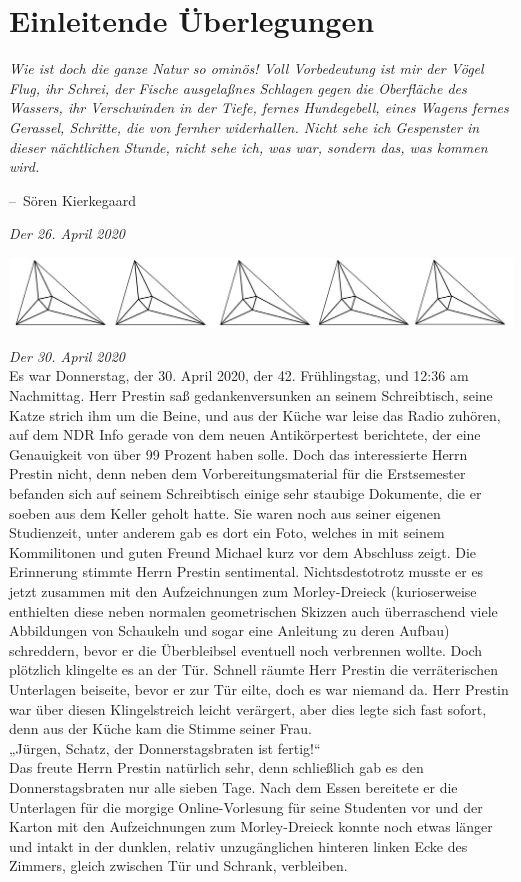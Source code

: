 \documentclass[oneside]{memoir}
\makeatletter
\newcommand{\parasep}{
\bigskip
\bigskip
\begin{center} 
   \includegraphics[scale=.08]{parasep5.jpg} 
\end{center}
\bigskip
\bigskip
}
\newenvironment{chapquote}[2][2em]
  {\setlength{\@tempdima}{#1}%
   \def\chapquote@author{#2}%
   \parshape 1 \@tempdima \dimexpr\textwidth-2\@tempdima\relax%
   \itshape}
  {\par\normalfont\hfill--\ \chapquote@author\hspace*{\@tempdima}\par\bigskip}
\makeatother
\begin{document}
\chapter{Einleitende Überlegungen} %
\begin{chapquote}{Sören Kierkegaard}
\glqq Wie ist doch die ganze Natur so ominös! Voll Vorbedeutung ist mir der Vögel Flug, ihr Schrei, der Fische ausgelaßnes Schlagen gegen die Oberfläche des Wassers, ihr Verschwinden in der Tiefe, fernes Hundegebell, eines Wagens fernes Gerassel, Schritte, die von fernher widerhallen. Nicht sehe ich Gespenster in dieser nächtlichen Stunde, nicht sehe ich, was war, sondern das, was kommen wird.\grqq
\end{chapquote}

\textit{Der 26. April 2020} \\ 

     
\parasep

\textit{Der 30. April 2020} \\
Es war Donnerstag, der 30. April 2020, der 42. Frühlingstag, und 12:36 am Nachmittag. Herr Prestin saß gedankenversunken an seinem Schreibtisch, seine Katze strich ihm um die Beine, und aus der Küche war leise das Radio zuhören, auf dem NDR Info gerade von dem neuen Antikörpertest berichtete, der eine Genauigkeit von über 99 Prozent haben solle. Doch das interessierte Herrn Prestin nicht, denn neben dem Vorbereitungsmaterial für die Erstsemester befanden sich auf seinem Schreibtisch einige sehr staubige Dokumente, die er soeben aus dem Keller geholt hatte. Sie waren noch aus seiner eigenen Studienzeit, unter anderem gab es dort ein Foto, welches in mit seinem Kommilitonen und guten Freund Michael kurz vor dem Abschluss zeigt. Die Erinnerung stimmte Herrn Prestin sentimental. Nichtsdestotrotz musste er es jetzt zusammen mit den Aufzeichnungen zum Morley-Dreieck (kurioserweise enthielten diese neben normalen geometrischen Skizzen auch überraschend viele Abbildungen von Schaukeln und sogar eine Anleitung zu deren Aufbau) schreddern, bevor er die Überbleibsel eventuell noch verbrennen wollte. Doch plötzlich klingelte es an der Tür. Schnell räumte Herr Prestin die verräterischen Unterlagen beiseite, bevor er zur Tür eilte, doch es war niemand da. Herr Prestin war über diesen Klingelstreich leicht verärgert, aber dies legte sich fast sofort, denn aus der Küche kam die Stimme seiner Frau. \\
„Jürgen, Schatz, der Donnerstagsbraten ist fertig!“ \\
Das freute Herrn Prestin natürlich sehr, denn schließlich gab es den Donnerstagsbraten nur alle sieben Tage. Nach dem Essen bereitete er die Unterlagen für die morgige Online-Vorlesung für seine Studenten vor und der Karton mit den Aufzeichnungen zum Morley-Dreieck konnte noch etwas länger und intakt in der dunklen, relativ unzugänglichen hinteren linken Ecke des Zimmers, gleich zwischen Tür und Schrank, verbleiben. 
     
\end{document}
